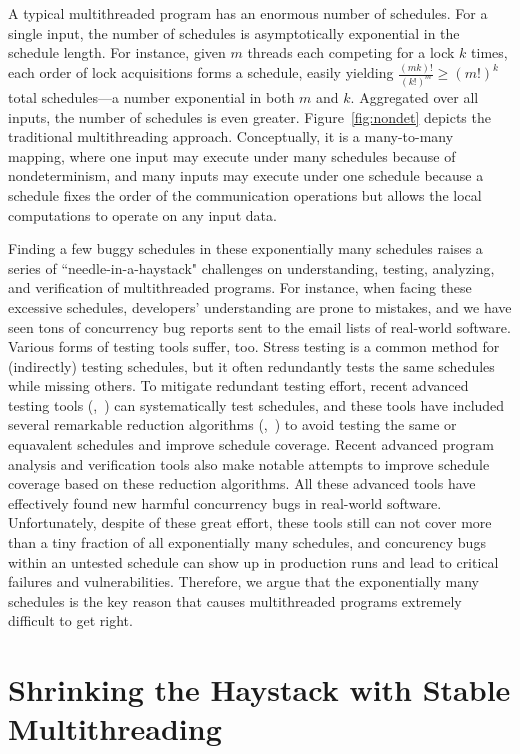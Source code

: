 A typical multithreaded program has an enormous number of schedules.  For
a single input, the number of schedules is asymptotically exponential in
the schedule length.  For instance, given $m$ threads each competing for a
lock $k$ times, each order of lock acquisitions forms a schedule, easily
yielding $\frac{(mk)!}{(k!)^m} \ge (m!)^k$ total schedules---a number
exponential in both $m$ and $k$. Aggregated over all inputs, the number of
schedules is even greater. Figure~\ref{fig:nondet} depicts the traditional
multithreading approach. Conceptually, it is a many-to-many mapping, where one
input may execute under many schedules because of nondeterminism, and many
inputs may execute under one schedule because a schedule fixes the order of the
communication operations but allows the local computations to operate on
any input data.

Finding a few buggy schedules in these exponentially many schedules raises
a series of ``needle-in-a-haystack" challenges on understanding, testing,
analyzing, and verification of multithreaded programs. For instance, when facing
these excessive schedules, developers' understanding are prone to mistakes, and
we have seen tons of concurrency bug reports sent to the email lists of
real-world software. Various forms of testing tools suffer, too.  Stress testing
is a common method for (indirectly) testing schedules, but it often redundantly
tests the same schedules while missing others. To mitigate redundant testing
effort, recent advanced testing tools (\eg,~\cite{musuvathi:chess:osdi08,
modist:nsdi09, dbug:ssv10, demeter:sosp11}) can systematically test schedules,
and these tools have included several remarkable reduction algorithms
(\eg,~\cite{flanagan:dynamicpo, demeter:sosp11}) to avoid testing the same or
equavalent schedules and improve schedule coverage. Recent advanced program
analysis and verification tools also make notable attempts to improve schedule
coverage based on these reduction algorithms. All these advanced
tools have effectively found new harmful concurrency bugs in real-world
software. Unfortunately, despite of these great effort, these tools still can
not cover more than a tiny fraction of all exponentially many schedules, and
concurency bugs within an untested schedule can show up in production runs and
lead to critical failures and vulnerabilities. Therefore, we argue that the
exponentially many schedules is the key reason that causes multithreaded
programs extremely difficult to get right.


\section{Shrinking the Haystack with Stable Multithreading}
\label{sec:smt-potential}


